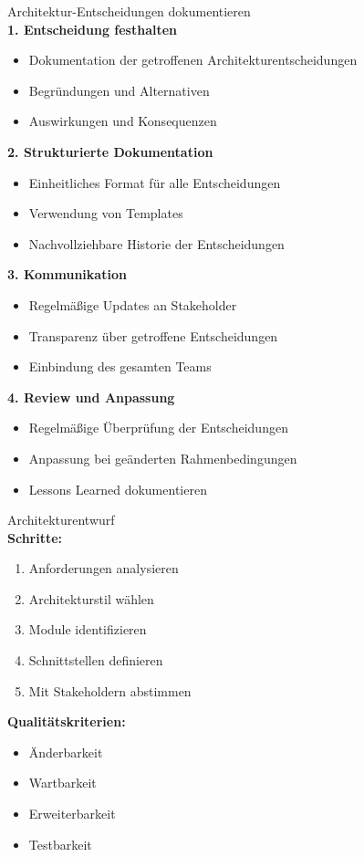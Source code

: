 \begin{KR}{Architektur-Entscheidungen dokumentieren}\\
\textbf{1. Entscheidung festhalten}
\begin{itemize}
    \item Dokumentation der getroffenen Architekturentscheidungen
    \item Begründungen und Alternativen
    \item Auswirkungen und Konsequenzen
\end{itemize}

\textbf{2. Strukturierte Dokumentation}
\begin{itemize}
    \item Einheitliches Format für alle Entscheidungen
    \item Verwendung von Templates
    \item Nachvollziehbare Historie der Entscheidungen
\end{itemize}

\textbf{3. Kommunikation}
\begin{itemize}
    \item Regelmäßige Updates an Stakeholder
    \item Transparenz über getroffene Entscheidungen
    \item Einbindung des gesamten Teams
\end{itemize}

\textbf{4. Review und Anpassung}
\begin{itemize}
    \item Regelmäßige Überprüfung der Entscheidungen
    \item Anpassung bei geänderten Rahmenbedingungen
    \item Lessons Learned dokumentieren
\end{itemize}
\end{KR}


\begin{KR}{Architekturentwurf}\\
\textbf{Schritte:}
\begin{enumerate}
    \item Anforderungen analysieren
    \item Architekturstil wählen
    \item Module identifizieren
    \item Schnittstellen definieren
    \item Mit Stakeholdern abstimmen
\end{enumerate}

\textbf{Qualitätskriterien:}
\begin{itemize}
    \item Änderbarkeit
    \item Wartbarkeit
    \item Erweiterbarkeit
    \item Testbarkeit
\end{itemize}
\end{KR}

